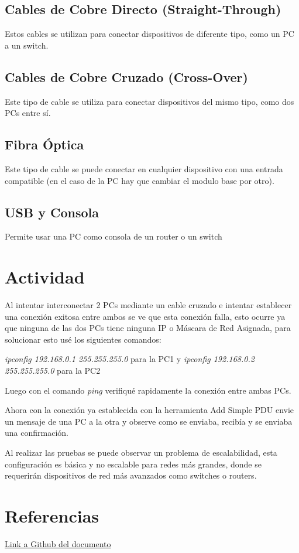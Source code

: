 \documentclass{article}
\begin{document}
\subsection{Cables de Cobre Directo (Straight-Through)}
\hspace{1cm}
Estos cables se utilizan para conectar dispositivos de diferente tipo, como un PC a un switch. 

\subsection{Cables de Cobre Cruzado (Cross-Over)}
\hspace{1cm}
Este tipo de cable se utiliza para conectar dispositivos del mismo tipo, como dos PCs entre sí.

\subsection{Fibra Óptica}
\hspace{1cm}
Este tipo de cable se puede conectar en cualquier dispositivo con una entrada compatible (en el caso de la PC hay que cambiar el modulo base por otro).

\subsection{USB y Consola}
\hspace{1cm}
Permite usar una PC como consola de un router o un switch

\section{Actividad}
\hspace{1cm}
Al intentar interconectar 2 PCs mediante un cable cruzado e intentar establecer una conexión exitosa entre ambos se ve que esta conexión falla, esto ocurre ya que ninguna de las dos PCs tiene ninguna IP o Máscara de Red Asignada, para solucionar esto usé los siguientes comandos:

\noindent
\textit{ipconfig 192.168.0.1 255.255.255.0} para la PC1 y
\textit{ipconfig 192.168.0.2 255.255.255.0} para la PC2

\noindent
Luego con el comando \textit{ping} verifiqué rapidamente la conexión entre ambas PCs.

\vspace{1em}\hspace{0.5cm}
Ahora con la conexión ya establecida con la herramienta Add Simple PDU envie un mensaje de una PC a la otra y observe como se enviaba, recibía y se enviaba una confirmación.

\vspace{1em}\hspace{0.5cm}
Al realizar las pruebas se puede observar un problema de escalabilidad, esta configuración es básica y no escalable para redes más grandes, donde se requerirán dispositivos de red más avanzados como switches o routers.

\section{Referencias}
\href{https://github.com/ariancovac/Introduccion-Packet-Tracer}{Link a Github del documento}
\end{document}

